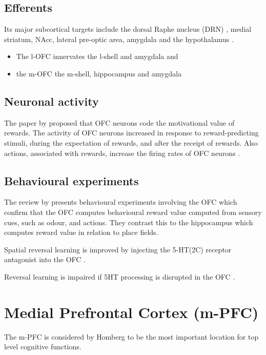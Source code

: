 \documentclass[12pt,a4paper]{article}
\begin{document}
\subsection{Efferents}
Its major subcortical targets include the dorsal Raphe nucleus (DRN)
\citep{Luo2015}, medial striatum, NAcc, lateral pre-optic area,
amygdala and the hypothalamus \citep{Vertes2012}.

\begin{itemize}
\item The l-OFC innervates the l-shell and amygdala and 
\item the m-OFC the m-shell, hippocampus and amygdala \citep{Brog1993,Noonan2012}
\end{itemize}
  
\subsection{Neuronal activity}
The paper by \citep{Tremblay1999} proposed that OFC neurons code the
motivational value of rewards. The activity of OFC neurons increased
in response to reward-predicting stimuli, during the expectation of
rewards, and after the receipt of rewards. Also actions, associated
with rewards, increase the firing rates of OFC neurons
\citep{Wikenheiser2016}.

\subsection{Behavioural experiments}
The review by \citep{Wikenheiser2016} presents behavioural experiments
involving the OFC which confirm that the OFC computes behavioural
reward value computed from sensory cues, such as odour, and
actions. They contrast this to the hippocampus which computes reward
value in relation to place fields.

Spatial reversal learning is improved by injecting the 5-HT(2C)
receptor antagonist into the OFC \citep{Boulougouris2010}.

Reversal learning is impaired if 5HT processing is disrupted in the
OFC \citep{Bari2013}.






\section{Medial Prefrontal Cortex (m-PFC)}
The m-PFC is considered by Homberg to be the most important location
for top level cognitive functions.
\end{document}
